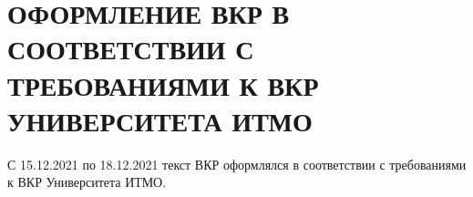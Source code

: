 \section{ОФОРМЛЕНИЕ ВКР В СООТВЕТСТВИИ С ТРЕБОВАНИЯМИ К ВКР УНИВЕРСИТЕТА ИТМО}

С 15.12.2021 по 18.12.2021 текст ВКР оформлялся в соответствии с требованиями к ВКР Университета ИТМО.